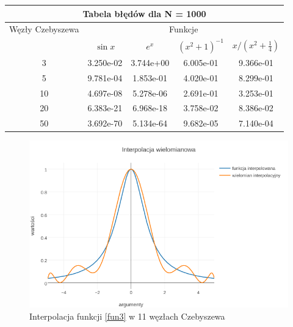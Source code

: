 \documentclass{article}
\begin{document}
\renewcommand{\arraystretch}{1.5}  
\begin{center}
	\begin{tabular}{||c||c|c|c|c||} \hline
		\multicolumn{5}{||c||}{Tabela błędów dla N = 1000} \\ \hline
		Węzły Czebyszewa 	& \multicolumn{4}{|c||}{Funkcje} \\ \cline{2-5}
		& $\sin x$ & $e^x$ & $(x^{2}+1)^{-1}$ & $x/(x^{2} + \frac{1}{4})$ \\ \hline					
		3 		& 3.250e-02 &  3.744e+00 &  6.005e-01 & 9.366e-01 \\ \hline
		5 		& 9.781e-04 &  1.853e-01 &  4.020e-01 & 8.299e-01 \\ \hline
		10  	& 4.697e-08 &  5.278e-06 &  2.691e-01 & 3.253e-01 \\ \hline
		20  	& 6.383e-21 &  6.968e-18 &  3.758e-02 & 8.386e-02 \\ \hline
		50  	& 3.692e-70 &  5.134e-64 &  9.682e-05 & 7.140e-04 \\ \hline
	\end{tabular}
\end{center}
\renewcommand{\arraystretch}{1}


\begin{figure}[ht]
	\begin{center}
		\includegraphics[width=13cm]{chebyshev_lagrange_c}
	\end{center}
	\caption{Interpolacja funkcji \eqref{fun3} w 11 węzłach Czebyszewa}
	\label{fig:4}
\end{figure}
\end{document}

